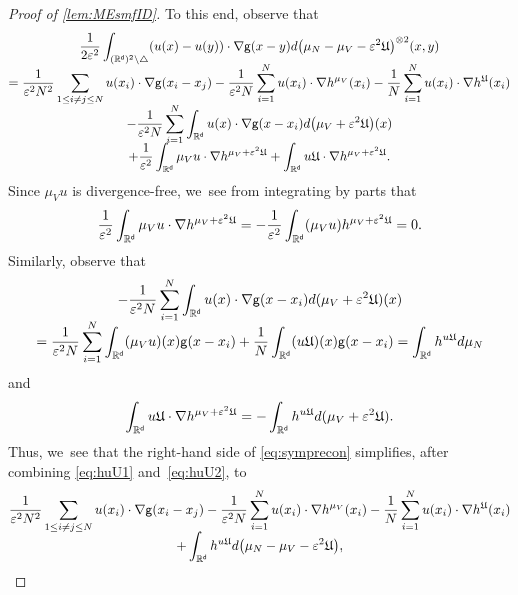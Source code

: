 \documentclass[10pt]{amsart}
\let\epsilon\varepsilon
\theoremstyle{plain}
\theoremstyle{definition}
\DeclarePairedDelimiter{\pa}{\lparen}{\rparen}
\let\div\relax
\DeclareMathOperator{\div}{\mathrm{div}}
\newcommand{\R}{{\mathbb{R}}}
\let\ep\epsilon
\let\vep\varepsilon
\newcommand{\Uu}{\mathfrak{U}}
\renewcommand{\d}{\mathsf{d}}
\newcommand{\g}{{\mathsf{g}}}
\begin{document}
\begin{proof}[Proof of \cref{lem:MEsmfID}]
To this end, observe that\vspace*{-8pt}
\begin{multline}\label{eq:symprecon}
\frac{1}{2\vep^2}\int_{(\R^\d)^2\setminus\triangle} \pa*{u(x)-u(y)}\cdot\nabla\g(x-y)d\pa*{\mu_N-\mu_V-\vep^2\Uu}^{\otimes 2}(x,y)\\[-5pt]
=\frac{1}{\vep^2 N^2}\sum_{1\leq i\neq j\leq N} u(x_i)\cdot\nabla\g(x_i-x_j) - \frac{1}{\vep^2 N}\sum_{i=1}^N u(x_i)\cdot\nabla h^{\mu_V}(x_i) - \frac{1}{N}\sum_{i=1}^N u(x_i)\cdot\nabla h^{\Uu}(x_i) \\[-5pt]
-\frac{1}{\vep^2 N}\sum_{i=1}^N\int_{\R^\d} u(x)\cdot\nabla\g(x-x_i)d\pa*{\mu_V+\ep^2\Uu}(x) \\[-5pt]
+ \frac{1}{\vep^2}\int_{\R^\d} \mu_V u\cdot\nabla h^{\mu_V+\vep^2\Uu} + \int_{\R^\d}u\Uu\cdot \nabla h^{\mu_V+\vep^2\Uu}.
\end{multline}
Since $\mu_V u$ is divergence-free, we~see from integrating by parts that\vspace*{-5pt}
\begin{align*}
\frac{1}{\vep^2}\int_{\R^\d} \mu_V u\cdot\nabla h^{\mu_V+\vep^2\Uu} =-\frac{1}{\vep^2}\int_{\R^\d}\div(\mu_V u) h^{\mu_V+\vep^2\Uu} =0.
\end{align*}
Similarly, observe that\vspace*{-8pt}
\begin{multline}
-\frac{1}{\vep^2N}\sum_{i=1}^N\int_{\R^\d}u(x)\cdot\nabla\g(x-x_i)d(\mu_V+\vep^2\Uu)(x)\\[-5pt]
= \frac{1}{\vep^2 N}\sum_{i=1}^N \int_{\R^\d}\div(\mu_V u)(x)\g(x-x_i) + \frac{1}{N} \int_{\R^\d}\div(u\Uu)(x) \g( x-x_i) =\int_{\R^\d}\div h^{u\Uu}d\mu_N \label{eq:huU1}
\end{multline}
and\vspace*{-5pt}
\begin{equation}\label{eq:huU2}
\int_{\R^\d}u\Uu\cdot \nabla h^{\mu_V+\vep^2\Uu} = -\int_{\R^\d}\div h^{u\Uu} d(\mu_V+\vep^2\Uu).
\end{equation}
Thus, we~see that the right-hand side of \eqref{eq:symprecon} simplifies, after combining \eqref{eq:huU1} and~\eqref{eq:huU2}, to\vspace*{-8pt}
\begin{multline*}
\frac{1}{\vep^2 N^2}\sum_{1\leq i\neq j\leq N} u(x_i)\cdot\nabla\g(x_i-x_j) - \frac{1}{\vep^2 N}\sum_{i=1}^N u(x_i)\cdot\nabla h^{\mu_V}(x_i)- \frac{1}{N}\sum_{i=1}^N u(x_i)\cdot\nabla h^{\Uu}(x_i) \\[-5pt]
+ \int_{\R^\d} \div h^{u\Uu}d\pa*{\mu_N-\mu_V-\vep^2\Uu},

\end{multline*}
\end{proof}
\end{document}

